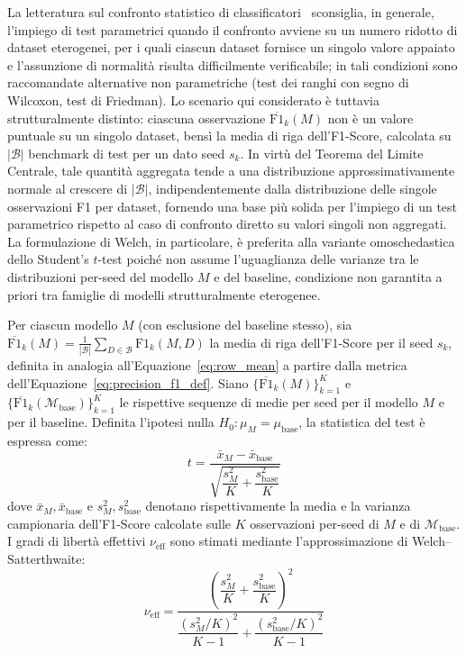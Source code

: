 La letteratura sul confronto statistico di classificatori~\cite{demsar2006} sconsiglia, in generale, l'impiego di test parametrici quando il confronto avviene su un numero ridotto di dataset eterogenei, per i quali ciascun dataset fornisce un singolo valore appaiato e l'assunzione di normalità risulta difficilmente verificabile; in tali condizioni sono raccomandate alternative non parametriche (test dei ranghi con segno di Wilcoxon, test di Friedman). Lo scenario qui considerato è tuttavia strutturalmente distinto: ciascuna osservazione $\overline{\text{F1}}_k(M)$ non è un valore puntuale su un singolo dataset, bensì la media di riga dell'F1-Score, calcolata su $|\mathcal{B}|$ benchmark di test per un dato seed $s_k$. In virtù del Teorema del Limite Centrale, tale quantità aggregata tende a una distribuzione approssimativamente normale al crescere di $|\mathcal{B}|$, indipendentemente dalla distribuzione delle singole osservazioni F1 per dataset, fornendo una base più solida per l'impiego di un test parametrico rispetto al caso di confronto diretto su valori singoli non aggregati. La formulazione di Welch, in particolare, è preferita alla variante omoschedastica dello Student's $t$-test poiché non assume l'uguaglianza delle varianze tra le distribuzioni per-seed del modello $M$ e del baseline, condizione non garantita a priori tra famiglie di modelli strutturalmente eterogenee.

Per ciascun modello $M$ (con esclusione del baseline stesso), sia $\overline{\text{F1}}_k(M) = \frac{1}{|\mathcal{B}|}\sum_{D\in\mathcal{B}} \text{F1}_k(M,D)$ la media di riga dell'F1-Score per il seed $s_k$, definita in analogia all'Equazione~\eqref{eq:row_mean} a partire dalla metrica dell'Equazione~\eqref{eq:precision_f1_def}. Siano $\{\overline{\text{F1}}_k(M)\}_{k=1}^{K}$ e $\{\overline{\text{F1}}_k(\mathcal{M}_{\text{base}})\}_{k=1}^{K}$ le rispettive sequenze di medie per seed per il modello $M$ e per il baseline. Definita l'ipotesi nulla $H_0: \mu_M = \mu_{\text{base}}$, la statistica del test è espressa come:
\begin{equation}
    t = \frac{\bar{x}_M - \bar{x}_{\text{base}}}{\sqrt{\dfrac{s_M^2}{K} + \dfrac{s_{\text{base}}^2}{K}}}
    \label{eq:welch_statistic}
\end{equation}
dove $\bar{x}_M, \bar{x}_{\text{base}}$ e $s_M^2, s_{\text{base}}^2$ denotano rispettivamente la media e la varianza campionaria dell'F1-Score calcolate sulle $K$ osservazioni per-seed di $M$ e di $\mathcal{M}_{\text{base}}$. I gradi di libertà effettivi $\nu_{\text{eff}}$ sono stimati mediante l'approssimazione di Welch--Satterthwaite:
\begin{equation}
    \nu_{\text{eff}} = \frac{\left( \dfrac{s_M^2}{K} + \dfrac{s_{\text{base}}^2}{K} \right)^2}{\dfrac{(s_M^2/K)^2}{K-1} + \dfrac{(s_{\text{base}}^2/K)^2}{K-1}}
    \label{eq:welch_dof}
\end{equation}

